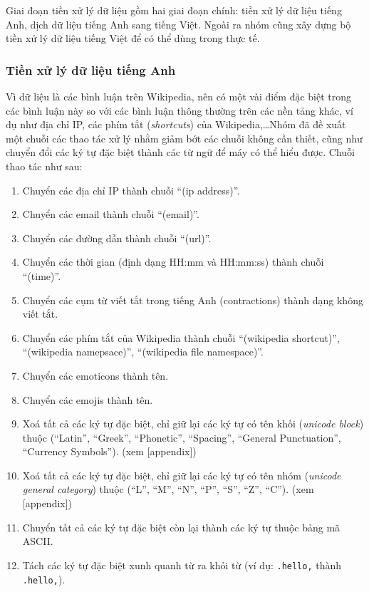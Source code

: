 Giai đoạn tiền xử lý dữ liệu gồm hai giai đoạn chính: tiền xử lý dữ liệu tiếng Anh, dịch dữ liệu tiếng Anh sang tiếng Việt. Ngoài ra nhóm cũng xây dựng bộ tiền xử lý dữ liệu tiếng Việt để có thể dùng trong thực tế.

\subsubsection{Tiền xử lý dữ liệu tiếng Anh}\label{english-preprocess}
Vì dữ liệu là các bình luận trên Wikipedia, nên có một vài điểm đặc biệt trong các bình luận này so với các bình luận thông thường trên các nền tảng khác, ví dụ như địa chỉ IP, các phím tắt (\textit{shortcuts}) của Wikipedia,\dots Nhóm đã đề xuất một chuỗi các thao tác xử lý nhằm giảm bớt các chuỗi không cần thiết, cũng như chuyển đổi các ký tự đặc biệt thành các từ ngữ để máy có thể hiểu được. Chuỗi thao tác như sau:
\begin{enumerate}
    \item Chuyển các địa chỉ IP thành chuỗi ``(ip address)''.
    \item Chuyển các email thành chuỗi ``(email)''.
    \item Chuyển các đường dẫn thành chuỗi ``(url)''.
    \item Chuyển các thời gian (định dạng HH:mm và HH:mm:ss) thành chuỗi ``(time)''.
    \item Chuyển các cụm từ viết tắt trong tiếng Anh (contractions) thành dạng không viết tắt.
    \item Chuyển các phím tắt của Wikipedia thành chuỗi ``(wikipedia shortcut)'', ``(wikipedia namepsace)'', ``(wikipedia file namespace)''.
    \item Chuyển các emoticons thành tên.
    \item Chuyển các emojis thành tên.
    \item Xoá tất cả các ký tự đặc biệt, chỉ giữ lại các ký tự có tên khối (\textit{unicode block}) thuộc (``Latin'', ``Greek'', ``Phonetic'', ``Spacing'', ``General Punctuation'', ``Currency Symbols''). (xem [appendix])
    \item Xoá tất cả các ký tự đặc biệt, chỉ giữ lại các ký tự có tên nhóm (\textit{unicode general category}) thuộc (``L'', ``M'', ``N'', ``P'', ``S'', ``Z'', ``C''). (xem [appendix])
    \item Chuyển tất cả các ký tự đặc biệt còn lại thành các ký tự thuộc bảng mã ASCII.
    \item Tách các ký tự đặc biệt xunh quanh từ ra khỏi từ (ví dụ: {\tt .hello,} thành {\tt .\textvisiblespace hello\textvisiblespace,}).
\end{enumerate}

